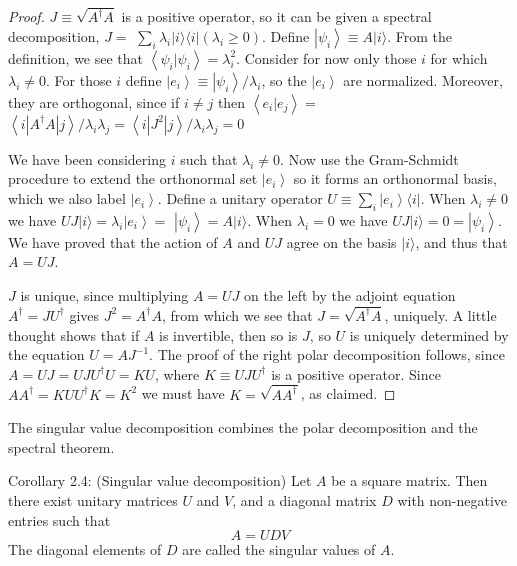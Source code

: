 \begin{proof}
    $J \equiv \sqrt{A^{\dagger} A}$ is a positive operator, so it can be given a spectral decomposition, $J=$ $\sum_{i} \lambda_{i}|i\rangle\langle i|\left(\lambda_{i} \geq 0\right)$. Define $\left|\psi_{i}\right\rangle \equiv A|i\rangle$. From the definition, we see that $\left\langle\psi_{i} | \psi_{i}\right\rangle=\lambda_{i}^{2}$. Consider for now only those $i$ for which $\lambda_{i} \neq 0$. For those $i$ define $\left|e_{i}\right\rangle \equiv\left|\psi_{i}\right\rangle / \lambda_{i}$, so the $\left|e_{i}\right\rangle$ are normalized. Moreover, they are orthogonal, since if $i \neq j$ then $\left\langle e_{i} | e_{j}\right\rangle=$ $\left\langle i\left|A^{\dagger} A\right| j\right\rangle / \lambda_{i} \lambda_{j}=\left\langle i\left|J^{2}\right| j\right\rangle / \lambda_{i} \lambda_{j}=0$

We have been considering $i$ such that $\lambda_{i} \neq 0$. Now use the Gram-Schmidt procedure to extend the orthonormal set $\left|e_{i}\right\rangle$ so it forms an orthonormal basis, which we also label $\left|e_{i}\right\rangle$. Define a unitary operator $U \equiv \sum_{i}\left|e_{i}\right\rangle\langle i|$. When $\lambda_{i} \neq 0$ we have $U J|i\rangle=\lambda_{i}\left|e_{i}\right\rangle=$ $\left|\psi_{i}\right\rangle=A|i\rangle$. When $\lambda_{i}=0$ we have $U J|i\rangle=0=\left|\psi_{i}\right\rangle$. We have proved that the action of $A$ and $U J$ agree on the basis $|i\rangle$, and thus that $A=U J$.

$J$ is unique, since multiplying $A=U J$ on the left by the adjoint equation $A^{\dagger}=J U^{\dagger}$ gives $J^{2}=A^{\dagger} A$, from which we see that $J=\sqrt{A^{\dagger} A}$, uniquely. A little thought shows that if $A$ is invertible, then so is $J$, so $U$ is uniquely determined by the equation $U=A J^{-1}$. The proof of the right polar decomposition follows, since $A=U J=U J U^{\dagger} U=K U$, where $K \equiv U J U^{\dagger}$ is a positive operator. Since $A A^{\dagger}=K U U^{\dagger} K=K^{2}$ we must have $K=\sqrt{A A^{\dagger}}$, as claimed.
\end{proof}

The singular value decomposition combines the polar decomposition and the spectral theorem.

\begin{corollary}
Corollary 2.4: (Singular value decomposition) Let $A$ be a square matrix. Then there exist unitary matrices $U$ and $V$, and a diagonal matrix $D$ with non-negative entries such that
\begin{equation}
    A=U D V
\end{equation}
The diagonal elements of $D$ are called the singular values of $A$.
\end{corollary}

